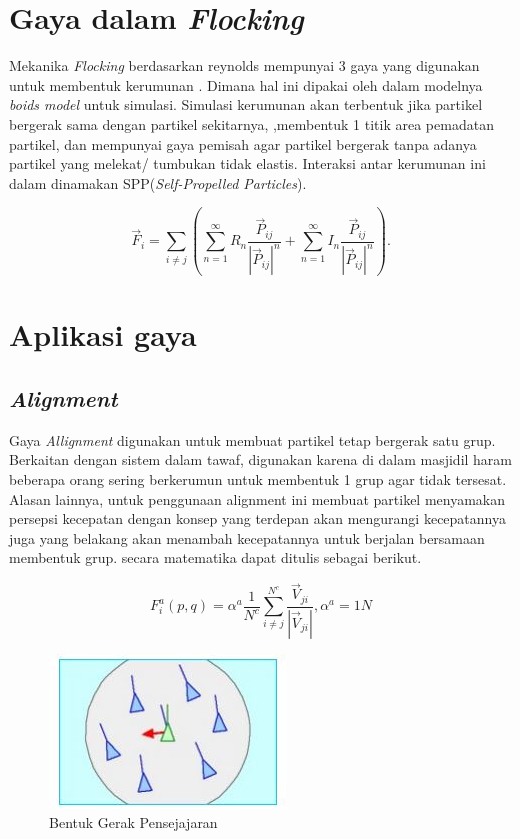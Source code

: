 \section{Gaya dalam \emph{Flocking}}\label{sec:flocking}

Mekanika \emph{Flocking} berdasarkan reynolds mempunyai 3 gaya yang digunakan untuk membentuk kerumunan   \citep{Reynolds1987} \citep{Nasir2016}. Dimana hal ini dipakai oleh \citep{Chate2008} dalam modelnya \emph{boids model} untuk simulasi. Simulasi kerumunan akan terbentuk jika partikel bergerak sama dengan partikel sekitarnya, ,membentuk 1 titik area pemadatan partikel, dan mempunyai gaya pemisah agar partikel bergerak tanpa adanya partikel yang melekat/ tumbukan tidak elastis. Interaksi antar kerumunan ini dalam \citep{Chate2008} dinamakan SPP(\textit{Self-Propelled Particles}). 

\begin{equation}
\vec{F}_i = \sum_{i \neq j} (\sum_{n=1}^{\infty} R_{n} \dfrac{\vec{P}_{ij}}{|\vec{P}_{ij}|^n}  + \sum_{n=1}^{\infty} I_{n} \dfrac{\vec{P}_{ij}}{|\vec{P}_{ij}|^n}). 
\end{equation}

\section{Aplikasi gaya}\label{cha:aplikasi gaya}

\subsection{\emph{Alignment}}\label{sec:alignment}
\hspace {0.5cm} Gaya \emph{Allignment} digunakan untuk membuat partikel tetap bergerak satu grup. Berkaitan dengan sistem dalam tawaf, digunakan karena di dalam masjidil haram beberapa orang sering berkerumun untuk membentuk 1 grup agar tidak tersesat. Alasan lainnya, untuk penggunaan alignment ini membuat partikel menyamakan persepsi kecepatan dengan konsep yang terdepan akan mengurangi kecepatannya juga yang belakang akan menambah kecepatannya untuk berjalan bersamaan membentuk grup. secara matematika dapat ditulis sebagai berikut.

\begin{equation}
 F_i^a(p,q) = \alpha^a \dfrac{1}{N^c}\sum^{N^c}_{i \neq j}\dfrac{\vec{V}_{ji}}{|\vec{V}_{ji}|},\alpha^a = 1N
\end{equation}


\begin{figure}
\centering
\includegraphics[scale=0.5]{gambar/allignment}
\caption{Bentuk Gerak Pensejajaran}
\end{figure}

